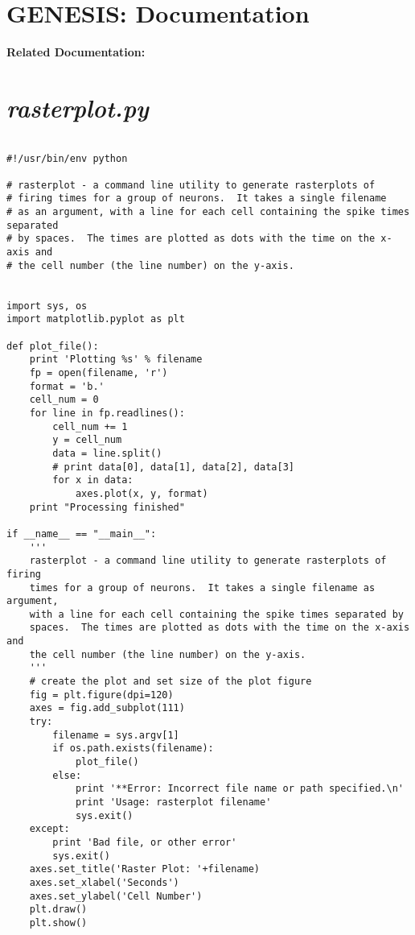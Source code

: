 \documentclass[12pt]{article}
\begin{document}
\section*{GENESIS: Documentation}

{\bf Related Documentation:}

\section*{\it rasterplot.py}

\begin{verbatim}

#!/usr/bin/env python

# rasterplot - a command line utility to generate rasterplots of
# firing times for a group of neurons.  It takes a single filename
# as an argument, with a line for each cell containing the spike times separated
# by spaces.  The times are plotted as dots with the time on the x-axis and
# the cell number (the line number) on the y-axis.


import sys, os
import matplotlib.pyplot as plt

def plot_file():
    print 'Plotting %s' % filename
    fp = open(filename, 'r')
    format = 'b.'
    cell_num = 0
    for line in fp.readlines():
        cell_num += 1
        y = cell_num
        data = line.split()
        # print data[0], data[1], data[2], data[3]
        for x in data:
            axes.plot(x, y, format)
    print "Processing finished"

if __name__ == "__main__":
    '''
    rasterplot - a command line utility to generate rasterplots of firing
    times for a group of neurons.  It takes a single filename as argument,
    with a line for each cell containing the spike times separated by
    spaces.  The times are plotted as dots with the time on the x-axis and
    the cell number (the line number) on the y-axis.
    '''
    # create the plot and set size of the plot figure
    fig = plt.figure(dpi=120)
    axes = fig.add_subplot(111)
    try:
        filename = sys.argv[1]
        if os.path.exists(filename):            
            plot_file()
        else:
            print '**Error: Incorrect file name or path specified.\n'
            print 'Usage: rasterplot filename'
            sys.exit()
    except:
        print 'Bad file, or other error'
        sys.exit()
    axes.set_title('Raster Plot: '+filename)
    axes.set_xlabel('Seconds')
    axes.set_ylabel('Cell Number')
    plt.draw()
    plt.show()

\end{verbatim}
\end{document}
